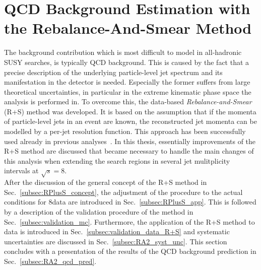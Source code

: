 \section{QCD Background Estimation with the Rebalance-And-Smear Method}
\label{subsec:RA2_QCD}
The background contribution which is most difficult to model in all-hadronic SUSY searches, is typically QCD background. This is caused by the fact that a precise description of the underlying particle-level jet spectrum and its manifestation in the detector is needed. Especially the former suffers from large theoretical uncertainties, in particular in the extreme kinematic phase space the analysis is performed in. To overcome this, the data-based \textit{Rebalance-and-Smear} (R+S) method was developed. It is based on the assumption that if the momenta of particle-level jets in an event are known, the reconstructed jet momenta can be modelled by a per-jet resolution function. This approach has been successfully used already in previous analyses~\cite{springerlink:10.1007/JHEP08(2011)155, Chatrchyan:2012lia}. In this thesis, essentially improvements of the R+S method are discussed that became necessary to handle the main changes of this analysis when extending the search regions in several jet mulitplicity intervals at $\sqrt{s} = 8$\tev. \\
After the discussion of the general concept of the R+S method in Sec.~\ref{subsec:RPlusS_concept}, the adjustment of the procedure to the actual conditions for 8\tev data are introduced in Sec.~\ref{subsec:RPlusS_app}. This is followed by a description of the validation procedure of the method in Sec.~\ref{subsec:validation_mc}. Furthermore, the application of the R+S method to data is introduced in Sec.~\ref{subsec:validation_data_R+S} and systematic uncertainties are discussed in Sec.~\ref{subsec:RA2_syst_unc}. This section concludes with a presentation of the results of the QCD background prediction in Sec.~\ref{subsec:RA2_qcd_pred}. 

